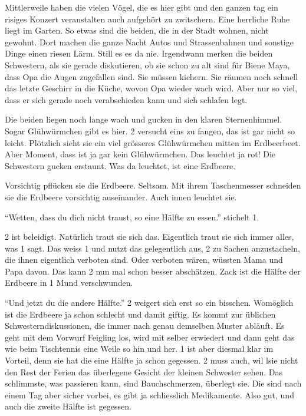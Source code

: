 \begin{mdframed}[style=mystyle]
Mittlerweile haben die vielen Vögel, die es hier gibt und den ganzen tag ein risiges Konzert veranstalten auch aufgehört zu zwitschern. Eine herrliche Ruhe liegt im Garten. So etwas sind die beiden, die in der Stadt wohnen, nicht gewohnt. Dort machen die ganze Nacht Autos und Strassenbahnen und sonstige Dinge einen riesen Lärm. Still es es da nie. Irgendwann merken die beiden Schwestern, als sie gerade diskutieren, ob sie schon zu alt sind für Biene Maya, dass Opa die Augen zugefallen sind. Sie müssen kichern. Sie räumen noch schnell das letzte Geschirr in die Küche, wovon Opa wieder wach wird. Aber nur so viel, dass er sich gerade noch verabschieden kann und sich schlafen legt.

Die beiden liegen noch lange wach und gucken in den klaren Sternenhimmel. Sogar Glühwürmchen gibt es hier. 2 versucht eins zu fangen, das ist gar nicht so leicht. Plötzlich sieht sie ein viel grösseres Glühwürmchen mitten im Erdbeerbeet. Aber Moment, dass ist ja gar kein Glühwürmchen. Das leuchtet ja rot! Die Schwestern gucken erstaunt. Was da leuchtet, ist eine Erdbeere.

Vorsichtig pflücken sie die Erdbeere. Seltsam. Mit ihrem Taschenmesser schneiden sie die Erdbeere vorsichtig auseinander. Auch innen leuchtet sie.

\enquote{Wetten, dass du dich nicht traust, so eine Hälfte zu essen.} stichelt 1. 

2 ist beleidigt. Natürlich traut sie sich das. Eigentlich traut sie sich immer alles, was 1 sagt. Das weiss 1 und nutzt das gelegentlich aus, 2 zu Sachen anzustacheln, die ihnen eigentlich verboten sind. Oder verboten wären, wüssten Mama und Papa davon. Das kann 2 nun mal schon besser abschätzen. Zack ist die Hälfte der Erdbeere in 1 Mund verschwunden.

\enquote{Und jetzt du die andere Hälfte.} 2 weigert sich erst so ein bisschen. Womöglich ist die Erdbeere ja schon schlecht und damit giftig. Es kommt zur üblichen Schwesterndiskussionen, die immer nach genau demselben Muster abläuft. Es geht mit dem Vorwurf Feigling los, wird mit selber erwiedert und dann geht das wie beim Tischtennis eine Weile so hin und her. 1 ist aber diesmal klar im Vorteil, denn sie hat die eine Hälfte ja schon gegessen. 2 muss auch, wil lsie nicht den Rest der Ferien das überlegene Gesicht der kleinen Schwester sehen. Das schlimmste, was passieren kann, sind Bauchschmerzen, überlegt sie. Die sind nach einem Tag aber sicher vorbei, es gibt ja schliesslich Medikamente. Also gut, und auch die zweite Hälfte ist gegessen.


\end{mdframed}

